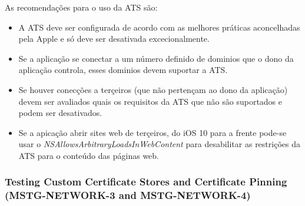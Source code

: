 As recomendações para o uso da ATS são:
\begin{itemize}
\item A ATS deve ser configurada de acordo com as melhores práticas aconcelhadas pela Apple e só deve ser desativada excecionalmente.\par
\hfill\par
\item Se a aplicação se conectar a um número definido de dominios que o dono da aplicação controla, esses dominios devem suportar a ATS.\par
\hfill\par
\item Se houver conecções a terçeiros (que não pertençam ao dono da aplicação) devem ser avaliados quais os requisitos da ATS que não são suportados e podem ser desativados.\par
\hfill\par
\item Se a apicação abrir sites web de terçeiros, do iOS 10 para a frente pode-se usar o \textit{NSAllowsArbitraryLoadsInWebContent} para desabilitar as restrições da ATS para o conteúdo das páginas web.
\end{itemize}

\subsubsection{Testing Custom Certificate Stores and Certificate Pinning (MSTG-NETWORK-3 and MSTG-NETWORK-4)}
\hfill\par
\hfill\par

